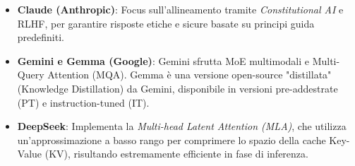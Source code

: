         \begin{itemize}
            \item \textbf{Claude (Anthropic)}: Focus sull'allineamento tramite \textit{Constitutional AI} e RLHF, per garantire risposte etiche e sicure basate su principi guida predefiniti.
            \item \textbf{Gemini e Gemma (Google)}: Gemini sfrutta MoE multimodali e Multi-Query Attention (MQA). Gemma è una versione open-source "distillata" (Knowledge Distillation) da Gemini, disponibile in versioni pre-addestrate (PT) e instruction-tuned (IT).
            \item \textbf{DeepSeek}: Implementa la \textit{Multi-head Latent Attention (MLA)}, che utilizza un'approssimazione a basso rango per comprimere lo spazio della cache Key-Value (KV), risultando estremamente efficiente in fase di inferenza.
        \end{itemize}
